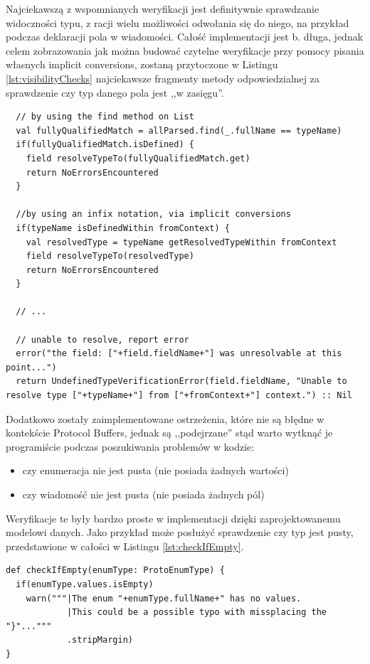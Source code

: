 \documentclass[pdflatex,11pt]{aghdpl}
\begin{document}
Najciekawszą z wspomnianych weryfikacji jest definitywnie sprawdzanie widoczności typu, z racji wielu możliwości odwołania się do niego,
na przykład podczas deklaracji pola w wiadomości. Całość implementacji jest b. długa, jednak celem zobrazowania jak można budować czytelne weryfikacje
przy pomocy pisania własnych implicit conversions, zostaną przytoczone w Listingu \ref{lst:visibilityChecks} najciekawsze fragmenty metody odpowiedzialnej
za sprawdzenie czy typ danego pola jest ,,w zasięgu''.

\begin{lstlisting}
  // by using the find method on List
  val fullyQualifiedMatch = allParsed.find(_.fullName == typeName)
  if(fullyQualifiedMatch.isDefined) {
    field resolveTypeTo(fullyQualifiedMatch.get)      
    return NoErrorsEncountered
  } 
    
  //by using an infix notation, via implicit conversions
  if(typeName isDefinedWithin fromContext) {
    val resolvedType = typeName getResolvedTypeWithin fromContext
    field resolveTypeTo(resolvedType)      
    return NoErrorsEncountered
  }
    
  // ... 

  // unable to resolve, report error
  error("the field: ["+field.fieldName+"] was unresolvable at this point...")
  return UndefinedTypeVerificationError(field.fieldName, "Unable to resolve type ["+typeName+"] from ["+fromContext+"] context.") :: Nil
\end{lstlisting}


Dodatkowo zostały zaimplementowane ostrzeżenia, które nie są błędne w kontekście Protocol Buffers,
jednak są ,,podejrzane'' stąd warto wytknąć je programiście podczas poszukiwania problemów w kodzie:

\begin{itemize}
 \item czy enumeracja nie jest pusta (nie posiada żadnych wartości)
 \item czy wiadomość nie jest pusta (nie posiada żadnych pól)
\end{itemize}

Weryfikacje te były bardzo proste w implementacji dzięki zaprojektowanemu modelowi danych. Jako przykład może posłużyć sprawdzenie czy typ jest pusty, 
przedstawione w całości w Listingu \ref{lst:checkIfEmpty}.

\begin{lstlisting}
def checkIfEmpty(enumType: ProtoEnumType) {
  if(enumType.values.isEmpty)
    warn("""|The enum "+enumType.fullName+" has no values.
            |This could be a possible typo with missplacing the "}"..."""
            .stripMargin)
}
\end{lstlisting}
\end{document}
